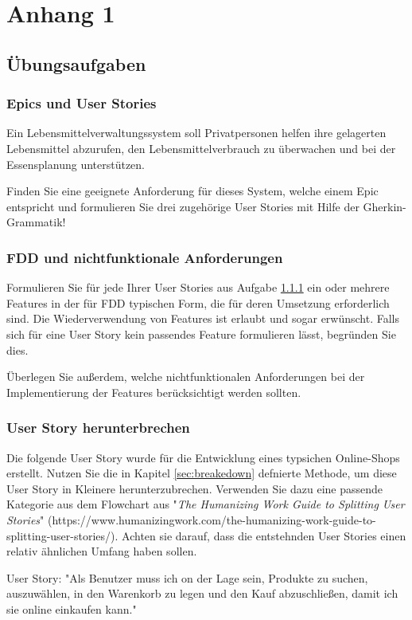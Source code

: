 \documentclass[acmtog]{acmart}
\begin{document}



\appendix

\section{Anhang 1}

\subsection{Übungsaufgaben}
\subsubsection{Epics und User Stories}\label{aufg:epics-und-user-stories}
Ein Lebensmittelverwaltungssystem soll Privatpersonen helfen ihre gelagerten Lebensmittel abzurufen,
den Lebensmittelverbrauch zu überwachen und bei der Essensplanung unterstützen.

Finden Sie eine geeignete Anforderung für dieses System, welche einem Epic entspricht und formulieren Sie drei zugehörige
User Stories mit Hilfe der Gherkin-Grammatik!

\subsubsection{FDD und nichtfunktionale Anforderungen}
Formulieren Sie für jede Ihrer User Stories aus Aufgabe \ref{aufg:epics-und-user-stories} ein oder mehrere Features in der für FDD typischen Form, die für deren Umsetzung erforderlich sind. Die Wiederverwendung von Features ist erlaubt und sogar erwünscht. Falls sich für eine User Story kein passendes Feature formulieren lässt, begründen Sie dies.

Überlegen Sie außerdem, welche nichtfunktionalen Anforderungen bei der Implementierung der Features berücksichtigt werden sollten.

\subsubsection{User Story herunterbrechen}
Die folgende User Story wurde für die Entwicklung eines typsichen Online-Shops erstellt. Nutzen Sie die in Kapitel \ref{sec:breakedown} defnierte Methode, 
um diese User Story in Kleinere herunterzubrechen. Verwenden Sie dazu eine passende Kategorie aus dem Flowchart aus "\emph{The Humanizing Work Guide to Splitting User Stories}" (https://www.humanizingwork.com/the-humanizing-work-guide-to-splitting-user-stories/).
Achten sie darauf, dass die entstehnden User Stories einen relativ ähnlichen Umfang haben sollen.

User Story:
"Als Benutzer muss ich on der Lage sein, Produkte zu suchen, auszuwählen, in den Warenkorb zu legen und den Kauf abzuschließen, damit ich sie online einkaufen kann."
\end{document}

